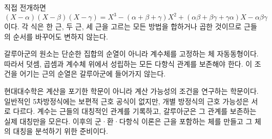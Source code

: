 \begin{solution}
직접 전개하면
\[
  (X-\alpha)(X-\beta)(X-\gamma)
  =X^3-(\alpha+\beta+\gamma)X^2
   +(\alpha\beta+\beta\gamma+\gamma\alpha)X
   -\alpha\beta\gamma
\]
이다. 각 식은 한 근, 두 근, 세 근을 고르는 모든 방법을 합하거나 곱한 것이므로 근들의 순서를 바꾸어도 변하지 않는다.
\end{solution}

\begin{solution}
갈루아군의 원소는 단순한 집합의 순열이 아니라 계수체를 고정하는 체 자동동형이다. 따라서 덧셈, 곱셈과 계수체 위에서 성립하는 모든 다항식 관계를 보존해야 한다. 이 조건을 어기는 근의 순열은 갈루아군에 들어가지 않는다.
\end{solution}

\begin{chapterreview}
현대대수학은 계산을 포기한 학문이 아니라 계산 가능성의 조건을 연구하는 학문이다. 일반적인 5차방정식에는 보편적 근호 공식이 없지만, 개별 방정식의 근호 가능성은 서로 다르다. 계수는 근들의 대칭적인 관계를 기록하고, 갈루아군은 그 관계를 보존하는 실제 대칭만을 모은다. 이후의 군·환·다항식 이론은 근을 포함하는 체를 만들고 그 체의 대칭을 분석하기 위한 준비이다.
\end{chapterreview}
